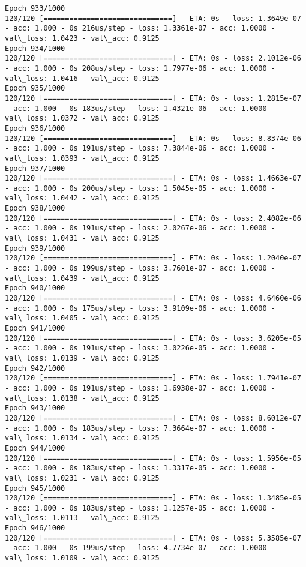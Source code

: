 \documentclass[11pt]{article}
\begin{document}
\begin{Verbatim}[commandchars=\\\{\}]
Epoch 933/1000
120/120 [==============================] - ETA: 0s - loss: 1.3649e-07 - acc: 1.000 - 0s 216us/step - loss: 1.3361e-07 - acc: 1.0000 - val\_loss: 1.0423 - val\_acc: 0.9125
Epoch 934/1000
120/120 [==============================] - ETA: 0s - loss: 2.1012e-06 - acc: 1.000 - 0s 208us/step - loss: 1.7977e-06 - acc: 1.0000 - val\_loss: 1.0416 - val\_acc: 0.9125
Epoch 935/1000
120/120 [==============================] - ETA: 0s - loss: 1.2815e-07 - acc: 1.000 - 0s 183us/step - loss: 1.4321e-06 - acc: 1.0000 - val\_loss: 1.0372 - val\_acc: 0.9125
Epoch 936/1000
120/120 [==============================] - ETA: 0s - loss: 8.8374e-06 - acc: 1.000 - 0s 191us/step - loss: 7.3844e-06 - acc: 1.0000 - val\_loss: 1.0393 - val\_acc: 0.9125
Epoch 937/1000
120/120 [==============================] - ETA: 0s - loss: 1.4663e-07 - acc: 1.000 - 0s 200us/step - loss: 1.5045e-05 - acc: 1.0000 - val\_loss: 1.0442 - val\_acc: 0.9125
Epoch 938/1000
120/120 [==============================] - ETA: 0s - loss: 2.4082e-06 - acc: 1.000 - 0s 191us/step - loss: 2.0267e-06 - acc: 1.0000 - val\_loss: 1.0431 - val\_acc: 0.9125
Epoch 939/1000
120/120 [==============================] - ETA: 0s - loss: 1.2040e-07 - acc: 1.000 - 0s 199us/step - loss: 3.7601e-07 - acc: 1.0000 - val\_loss: 1.0439 - val\_acc: 0.9125
Epoch 940/1000
120/120 [==============================] - ETA: 0s - loss: 4.6460e-06 - acc: 1.000 - 0s 175us/step - loss: 3.9109e-06 - acc: 1.0000 - val\_loss: 1.0405 - val\_acc: 0.9125
Epoch 941/1000
120/120 [==============================] - ETA: 0s - loss: 3.6205e-05 - acc: 1.000 - 0s 191us/step - loss: 3.0226e-05 - acc: 1.0000 - val\_loss: 1.0139 - val\_acc: 0.9125
Epoch 942/1000
120/120 [==============================] - ETA: 0s - loss: 1.7941e-07 - acc: 1.000 - 0s 191us/step - loss: 1.6938e-07 - acc: 1.0000 - val\_loss: 1.0138 - val\_acc: 0.9125
Epoch 943/1000
120/120 [==============================] - ETA: 0s - loss: 8.6012e-07 - acc: 1.000 - 0s 183us/step - loss: 7.3664e-07 - acc: 1.0000 - val\_loss: 1.0134 - val\_acc: 0.9125
Epoch 944/1000
120/120 [==============================] - ETA: 0s - loss: 1.5956e-05 - acc: 1.000 - 0s 183us/step - loss: 1.3317e-05 - acc: 1.0000 - val\_loss: 1.0231 - val\_acc: 0.9125
Epoch 945/1000
120/120 [==============================] - ETA: 0s - loss: 1.3485e-05 - acc: 1.000 - 0s 183us/step - loss: 1.1257e-05 - acc: 1.0000 - val\_loss: 1.0113 - val\_acc: 0.9125
Epoch 946/1000
120/120 [==============================] - ETA: 0s - loss: 5.3585e-07 - acc: 1.000 - 0s 199us/step - loss: 4.7734e-07 - acc: 1.0000 - val\_loss: 1.0109 - val\_acc: 0.9125

\end{Verbatim}
\end{document}
